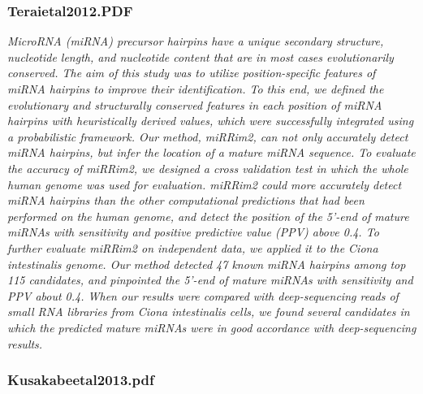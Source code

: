 \documentclass[graybox]{svmult}
\begin{document}
\subsubsection{Teraietal2012.PDF}
\cite{Terai2012}
\textit{MicroRNA (miRNA) precursor hairpins have a unique secondary structure, nucleotide length, and nucleotide content that are in most cases evolutionarily conserved. The aim of this study was to utilize position-specific features of miRNA hairpins to improve their identification. To this end, we defined the evolutionary and structurally conserved features in each position of miRNA hairpins with heuristically derived values, which were successfully integrated using a probabilistic framework. Our method, miRRim2, can not only accurately detect miRNA hairpins, but infer the location of a mature miRNA sequence. To evaluate the accuracy of miRRim2, we designed a cross validation test in which the whole human genome was used for evaluation. miRRim2 could more accurately detect miRNA hairpins than the other computational predictions that had been performed on the human genome, and detect the position of the 5'-end of mature miRNAs with sensitivity and positive predictive value (PPV) above 0.4. To further evaluate miRRim2 on independent data, we applied it to the Ciona intestinalis genome. Our method detected 47 known miRNA hairpins among top 115 candidates, and pinpointed the 5'-end of mature miRNAs with sensitivity and PPV about 0.4. When our results were compared with deep-sequencing reads of small RNA libraries from Ciona intestinalis cells, we found several candidates in which the predicted mature miRNAs were in good accordance with deep-sequencing results.}


\subsubsection{Kusakabeetal2013.pdf}
\end{document}
